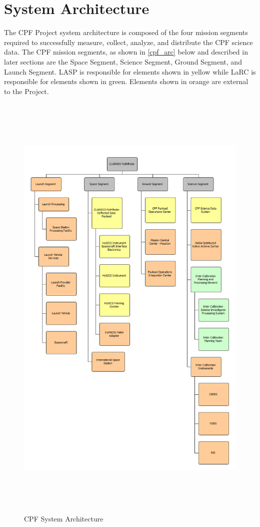 \section{System Architecture }
\label{systemarchitecture}

The \gls{CPF} Project system architecture is composed of the four mission segments required to successfully \gls{measure}, \gls{collect}, analyze, and distribute the \gls{CPF} science data. The \gls{CPF} mission segments, as shown in \autoref{cpf_arc} below and described in later sections are the Space Segment, Science Segment, Ground Segment, and Launch Segment. \gls{LASP} is responsible for elements shown in yellow while \gls{LaRC} is responsible for elements shown in green. Elements shown in orange are external to the Project.

\begin{figure}[htbp]
\centering
\includegraphics[keepaspectratio,width=\textwidth,height=8.5in]{20171214_cpf_architecture_l1-4.png}
\caption{\gls{CPF} System Architecture}
\label{cpf_arc}
\end{figure}

